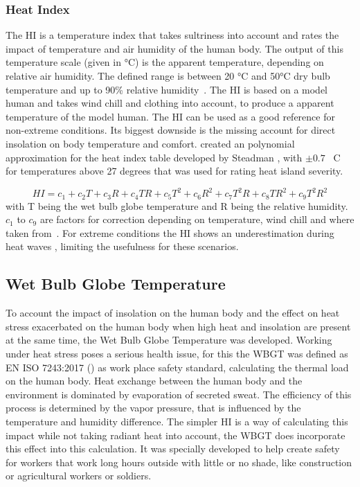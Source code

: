 \documentclass[12pt,a4paper, english,twoside]{scrartcl}
\begin{document}
    \subsubsection{Heat Index}\label{sec:heatIndex}
    The \gls{HI} is a temperature index that takes sultriness into account and rates the impact of temperature and air humidity of the human body. 
    The output of this temperature scale (given in °C) is the apparent temperature, depending on relative air humidity. 
    The defined range is between 20 °C and 50°C dry bulb temperature and up to 90\% relative humidity~\autocite[p. 862]{Steadman1979}. 
    The \gls{HI} is based on a model human and takes wind chill and clothing into account, to produce a apparent temperature of the model human. 
    The \gls{HI} can be used as a good reference for non-extreme conditions. 
    Its biggest downside is the missing account for direct insolation on body temperature and comfort.
    \Cite{Schoen2005} created an polynomial approximation for the heat index table developed by Steadman \autocite{Steadman1979}, with $\pm 0.7$ \textdegree\ C for temperatures above 27 degrees that was used for rating heat island severity.

    \begin{equation}
      HI = c_1 + c_2 T + c_3 R + c_4 T R + c_5 T^2 + c_6 R^2 + c_7 T^2 R + c_8 T R^2 + c_9 T^2 R^2
    \end{equation}
    with T being the wet bulb globe temperature and R being the relative humidity. 
    $c_1$ to $c_9$ are factors for correction depending on temperature, wind chill and where taken from~\cite{Cassano}.
    For extreme conditions the \gls{HI} shows an underestimation during heat waves \autocite{Romps2022}, limiting the usefulness for these scenarios.
    \subsection{Wet Bulb Globe Temperature}\label{sec:WBGT}
     To account the impact of insolation on the human body and the effect on heat stress exacerbated on the human body when high heat and insolation are present at the same time, the Wet Bulb Globe Temperature was developed. 
     Working under heat stress poses a serious health issue, for this the \gls{WBGT} was defined as EN ISO 7243:2017 (\cite{Iso7243_2017}) as work place safety standard, calculating the thermal load on the human body.
     Heat exchange between the human body and the environment is dominated by evaporation of secreted sweat.
     The efficiency of this process is determined by the vapor pressure, that is influenced by the temperature and humidity difference.
     The simpler \gls{HI} is a way of calculating this impact while not taking radiant heat into account, the \gls{WBGT} does incorporate this effect into this calculation.
     It was specially developed to help create safety for workers that work long hours outside with little or no shade, like construction or agricultural workers or soldiers.
\newpage
\end{document}
